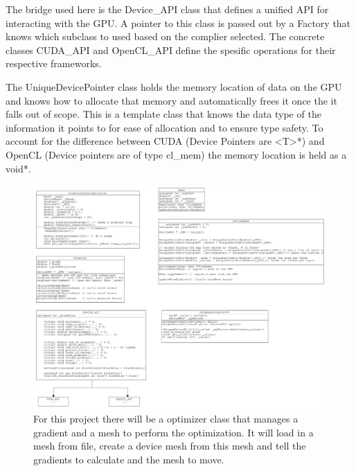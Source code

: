 \documentclass[]{article}
\begin{document}
The bridge used here is the Device\_API class that defines a unified API for interacting with the GPU. A pointer to this class is passed out by a Factory that knows which subclass to used based on the complier selected. The concrete classes CUDA\_API and OpenCL\_API define the spesific operations for their respective frameworks.

The UniqueDevicePointer class holds the memory location of data on the GPU and knows how to allocate that memory and automatically frees it once the it falls out of scope. This is a template class that knows the data type of the information it points to for ease of allocation and to ensure type safety. To account for the difference between CUDA (Device Pointers are <T>*) and OpenCL (Device pointers are of type cl\_mem) the memory location is held as a void*.
\begin{figure}[h]
	\centering
	\includegraphics[width=1\linewidth]{Classes}
	\caption[Class Diagram]{For this project there will be a optimizer class that manages a gradient and a mesh to perform the optimization. It will load in a mesh from file, create a device mesh from this mesh and tell the gradients to calculate and the mesh to move.}
	\label{fig:classes}
\end{figure}
\end{document}
